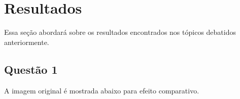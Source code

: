 \documentclass[conference]{IEEEtran}
\begin{document}
%



\section{Resultados}

Essa seção abordará sobre os resultados encontrados nos tópicos debatidos
anteriormente.

\subsection{Questão 1}

A imagem original é mostrada abaixo para efeito comparativo.
\end{document}
